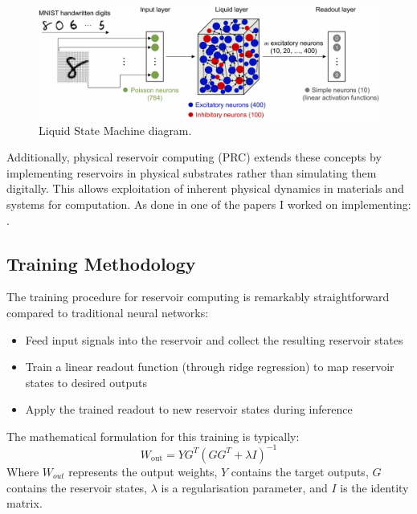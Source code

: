 \documentclass[numbered]{ivt-style/standard}
\begin{document}
\begin{figure}[H]
    \centering
    \includegraphics[width=1\linewidth]{figures/lsm_diag.png}
    \caption{Liquid State Machine diagram. \cite{WOO2024129334}}
    \label{fig:enter-label}
\end{figure}

Additionally, physical reservoir computing (PRC) extends these concepts by implementing reservoirs in physical substrates rather than simulating them digitally. This allows exploitation of inherent physical dynamics in materials and systems for computation. As done in one of the papers I worked on implementing: \cite{Mandal2022}.


\subsection{Training Methodology}

The training procedure for reservoir computing is remarkably straightforward compared to traditional neural networks:

\begin{itemize}
    \item Feed input signals into the reservoir and collect the resulting reservoir states
    \item Train a linear readout function (through ridge regression) to map reservoir states to desired outputs
    \item Apply the trained readout to new reservoir states during inference
\end{itemize}
    

The mathematical formulation for this training is typically:
\[
W_{\text{out}} = YG^T\left(GG^T + \lambda I\right)^{-1}
\]
Where $W_{out}$ represents the output weights, $Y$ contains the target outputs, $G$ contains the reservoir states, $\lambda$ is a regularisation parameter, and $I$ is the identity matrix.
\end{document}
